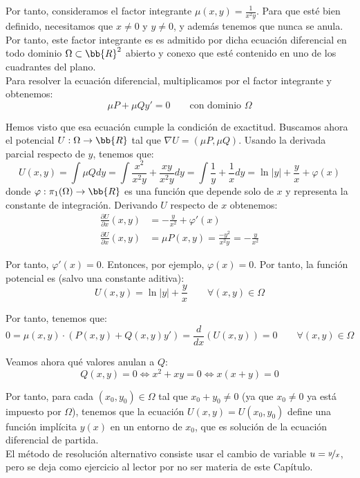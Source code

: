 \begin{ejercicio}
    Por tanto, consideramos el factor integrante $\mu(x,y)=\frac{1}{x^2y}$. Para que esté bien definido, necesitamos que $x\neq 0$ y $y\neq 0$, y además tenemos que nunca se anula. Por tanto, este factor integrante es es admitido por dicha ecuación diferencial en todo dominio $\Omega\subset \bb{R}^2$ abierto y conexo que esté contenido en uno de los cuadrantes del plano.\\

    Para resolver la ecuación diferencial, multiplicamos por el factor integrante y obtenemos:
    \begin{equation*}
        \mu P + \mu Q y' = 0 \qquad \text{con dominio }\Omega
    \end{equation*}

    Hemos visto que esa ecuación cumple la condición de exactitud. Buscamos ahora el potencial $U:\Omega\to\bb{R}$ tal que $\nabla U=(\mu P,\mu Q)$. Usando la derivada parcial respecto de $y$, tenemos que:
    \begin{equation*}
        U(x,y)=\int \mu Q dy = \int \frac{x^2}{x^2y} + \frac{xy}{x^2y} dy = \int \frac{1}{y} + \frac{1}{x} dy = \ln |y| + \frac{y}{x} + \varphi(x)
    \end{equation*}
    donde $\varphi:\pi_1(\Omega)\to\bb{R}$ es una función que depende solo de $x$ y representa la constante de integración. Derivando $U$ respecto de $x$ obtenemos:
    \begin{align*}
        \frac{\partial U}{\partial x}(x,y)&=-\frac{y}{x^2}+\varphi'(x)\\
        \frac{\partial U}{\partial x}(x,y)&=\mu P(x,y)=\frac{-y^2}{x^2y}= -\frac{y}{x^2}
    \end{align*}

    Por tanto, $\varphi'(x)=0$. Entonces, por ejemplo, $\varphi(x)=0$. Por tanto, la función potencial es (salvo una constante aditiva):
    \begin{equation*}
        U(x,y)=\ln |y| + \frac{y}{x}\qquad \forall (x,y)\in\Omega
    \end{equation*}

    Por tanto, tenemos que:
    \begin{equation*}
        0=\mu(x,y)\cdot (P(x,y)+Q(x,y)y')=\dfrac{d}{dx}\left(U(x,y)\right)=0\qquad \forall (x,y)\in\Omega
    \end{equation*}

    Veamos ahora qué valores anulan a $Q$:
    \begin{equation*}
        Q(x,y)=0 \Longleftrightarrow
        x^2+xy=0 \Longleftrightarrow x(x+y)=0
    \end{equation*}

    Por tanto, para cada $(x_0, y_0)\in \Omega$ tal que $x_0+y_0\neq 0$ (ya que $x_0\neq 0$ ya está impuesto por $\Omega$), tenemos que la ecuación $U(x,y)=U(x_0,y_0)$ define una función implícita $y(x)$ en un entorno de $x_0$, que es solución de la ecuación diferencial de partida.\\

    El método de resolución alternativo consiste usar el cambio de variable $u=\nicefrac{y}{x}$, pero se deja como ejercicio al lector por no ser materia de este Capítulo.
\end{ejercicio}

